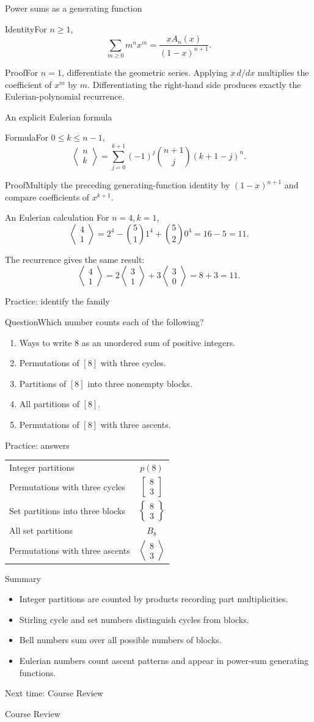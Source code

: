 \documentclass[aspectratio=169,11pt]{beamer}
\newcommand{\Thm}[2]{\begin{block}{#1}#2\end{block}}
\renewcommand{\Proof}[1]{\begin{block}{Proof}\normalsize #1\end{block}}
\newcommand{\Question}[1]{\begin{block}{Question}#1\end{block}}
\newcommand{\stir}[2]{\left\{\begin{matrix}#1\\#2\end{matrix}\right\}}
\newcommand{\cyc}[2]{\left[\begin{matrix}#1\\#2\end{matrix}\right]}
\newcommand{\eul}[2]{\left\langle\begin{matrix}#1\\#2\end{matrix}\right\rangle}
\newcommand{\gap}{\par\medskip}
\begin{document}
\begin{frame}{Power sums as a generating function}
\large
\Thm{Identity}{For $n\geq1$,
\[\sum_{m\geq0}m^nx^m=\frac{xA_n(x)}{(1-x)^{n+1}}.\]}
\Proof{For $n=1$, differentiate the geometric series. Applying $x\,d/dx$ multiplies the coefficient of $x^m$ by $m$. Differentiating the right-hand side produces exactly the Eulerian-polynomial recurrence.}
\end{frame}
\begin{frame}{An explicit Eulerian formula}
\large
\Thm{Formula}{For $0\leq k\leq n-1$,
\[\eul nk=\sum_{j=0}^{k+1}(-1)^j\binom{n+1}j(k+1-j)^n.\]}
\Proof{Multiply the preceding generating-function identity by $(1-x)^{n+1}$ and compare coefficients of $x^{k+1}$.}
\end{frame}
\begin{frame}{An Eulerian calculation}
\large
For $n=4,k=1$,
\[\eul41=2^4-\binom511^4+\binom520^4=16-5=11.\]
\gap The recurrence gives the same result:
\[\eul41=2\eul31+3\eul30=8+3=11.\]
\end{frame}
\begin{frame}{Practice: identify the family}
\large
\Question{Which number counts each of the following?}
\begin{enumerate}
\item Ways to write $8$ as an unordered sum of positive integers.
\item Permutations of $[8]$ with three cycles.
\item Partitions of $[8]$ into three nonempty blocks.
\item All partitions of $[8]$.
\item Permutations of $[8]$ with three ascents.
\end{enumerate}
\end{frame}
\begin{frame}{Practice: answers}
\large
\begin{center}\renewcommand{\arraystretch}{1.6}
\begin{tabular}{lc}
Integer partitions & $p(8)$\\
Permutations with three cycles & $\cyc83$\\
Set partitions into three blocks & $\stir83$\\
All set partitions & $B_8$\\
Permutations with three ascents & $\eul83$
\end{tabular}\end{center}
\end{frame}
\begin{frame}{Summary}
\large
\begin{itemize}
\item Integer partitions are counted by products recording part multiplicities.
\item Stirling cycle and set numbers distinguish cycles from blocks.
\item Bell numbers sum over all possible numbers of blocks.
\item Eulerian numbers count ascent patterns and appear in power-sum generating functions.
\end{itemize}
\end{frame}
\begin{frame}{Next time: Course Review}\begin{center}{\Huge Course Review}\end{center}\end{frame}
\end{document}
